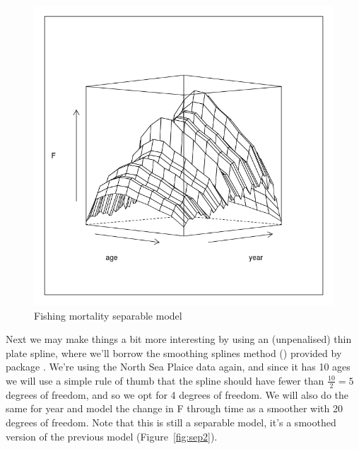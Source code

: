 \documentclass[a4paper,english,10pt]{article}\usepackage[]{graphicx}\usepackage[]{color}
\makeatletter
\def\maxwidth{ %
  \ifdim\Gin@nat@width>\linewidth
    \linewidth
  \else
    \Gin@nat@width
  \fi
}
\newenvironment{knitrout}{}{} %
\makeatother
\begin{document}
\begin{knitrout}
\color{fgcolor}\begin{figure}[H]

{\centering \includegraphics[width=\maxwidth]{figure/sep1-1} 

}

\caption[Fishing mortality separable model]{Fishing mortality separable model}\label{fig:sep1}
\end{figure}


\end{knitrout}

Next we may make things a bit more interesting by using an (unpenalised) thin plate spline, where we'll borrow the smoothing splines method () provided by package \href{http://cran.r-project.org/web/packages/mgcv/}{}. We're using the North Sea Plaice data again, and since it has 10 ages we will use a simple rule of thumb that the spline should have fewer than $\frac{10}{2} = 5$ degrees of freedom, and so we opt for 4 degrees of freedom. We will also do the same for year and model the change in F through time as a smoother with 20 degrees of freedom. Note that this is still a separable model, it's a smoothed version of the previous model (Figure~\ref{fig:sep2}).
\end{document}
